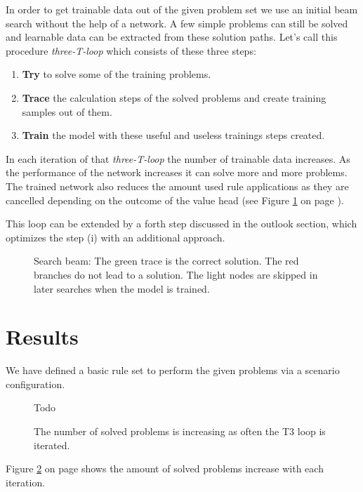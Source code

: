 \documentclass{scrartcl}
\theoremstyle{definition}
\begin{document}
In order to get trainable data out of the given problem set we use an initial beam search without the help of a network.
A few simple problems can still be solved and learnable data can be extracted from these solution paths.
Let's call this procedure \textit{three-T-loop} which consists of these three steps:

\begin{enumerate}[label=(\roman*)]
	\item \textbf{Try} to solve some of the training problems.
	\item \textbf{Trace} the calculation steps of the solved problems and create training samples out of them.
	\item \textbf{Train} the model with these useful and useless trainings steps created.
\end{enumerate}

In each iteration of that \textit{three-T-loop} the number of trainable data increases. 
As the performance of the network increases it can solve more and more problems.
The trained network also reduces the amount used rule applications as they are cancelled depending on the outcome of the value head (see Figure \ref{fig:beam_search} on page \pageref{fig:beam_search}). 


This loop can be extended by a forth step discussed in the outlook section, which optimizes the step (i) with an additional approach.

\begin{figure}[!htbp]
	\centering
	
	\caption{Search beam: The green trace is the correct solution.
	The red branches do not lead to a solution.
	The light nodes are skipped in later searches when the model is trained.}
	\label{fig:beam_search}
\end{figure}


\section{Results}

We have defined a basic rule set to perform the given problems via a scenario configuration.

\begin{figure}[!htbp]
	\centering
	Todo
	\caption{The number of solved problems is increasing as often the T3 loop is iterated.}
	\label{fig:t3loop_performance}
\end{figure}

Figure \ref{fig:t3loop_performance} on page \pageref{fig:t3loop_performance} shows the amount of solved problems increase with each iteration. 
\end{document}
